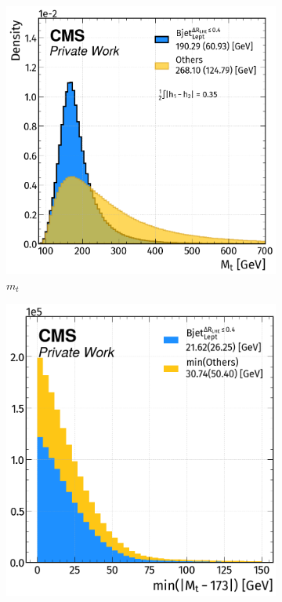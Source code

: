 \begin{figure}[H]
    \ContinuedFloat
    \vspace{-0.5cm}
    \centering
        \begin{subfigure}{0.513\linewidth}
        \centering
        \includegraphics[width=1\linewidth]{fig//chap08-kin_reco/Tmass.png}
        \caption{$m_t$}
    \end{subfigure}
    \hfill
    \begin{subfigure}{0.47\linewidth}  
        \centering
        \includegraphics[width=1\linewidth]{fig//chap08-kin_reco/min_Tmass.png}

\end{subfigure}
\end{figure}
